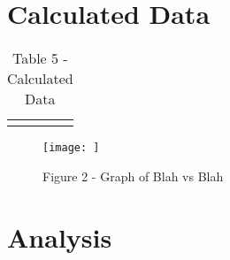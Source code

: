 \documentclass{lab}
\begin{document}
	\noindent\begin{minipage}{\textwidth}
        \section*{Calculated Data}
        \vspace{-0.2cm}
	\renewcommand{\arraystretch}{1.1}
        \begin{table}[H]
            \centering
            \begin{tabular}{l|l|l|l}
		    \dtoprule
	    	    \dbottomrule
	    \end{tabular}
	    \caption{Table 5 - Calculated Data}
	    \label{table: calculated-data}
	\end{table}
	\end{minipage}

	\begin{figure}[H]
		\texttt{[image:   ]}
		\caption{Figure 2 - Graph of Blah vs Blah}
		\label{fig: graph-1}
	\end{figure}

	\section*{Analysis}
	
\end{document}

